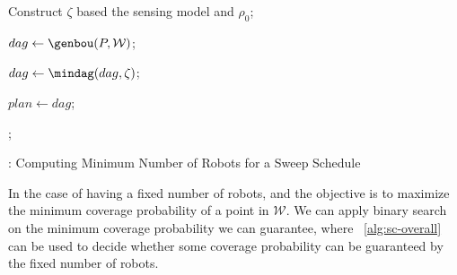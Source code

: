 \begin{algorithm}[ht]

\vspace{1mm}
Construct $\zeta$ based the sensing model and $\rho_0$;
\vspace{1mm}

\begin{small}
\end{small}
\vspace{1mm}
$dag\leftarrow \genbou(P, {\mathcal W})$;

\vspace{1mm}
$dag\gets \mindag(dag, \zeta)$;

\vspace{1mm}
$plan\gets dag$;

\vspace{1mm}
\begin{small}
\end{small}

\vspace{1mm}
;

\caption{\protect{}: Computing Minimum Number of Robots for a Sweep Schedule}
\label{alg:sc-overall}
\end{algorithm}



\begin{remark}
In the case of having a fixed number of robots, 
and the objective is to 
maximize the minimum coverage probability of a point in $\mathcal W$.
We can apply binary search on the minimum coverage probability we can guarantee, 
where ~\ref{alg:sc-overall} can be used to decide whether some coverage probability can be guaranteed by 
the fixed number of robots.
\end{remark}

